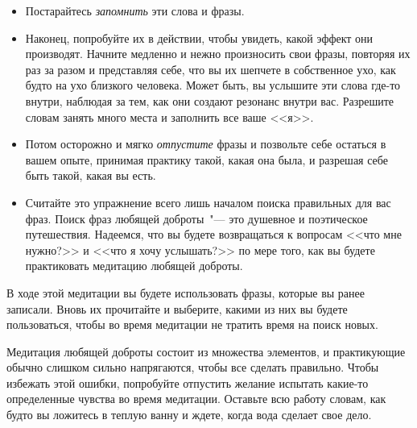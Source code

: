\begin{itemize}
	\item Постарайтесь \emph{запомнить} эти слова и фразы.
	
	\item Наконец, попробуйте их в действии, чтобы увидеть, какой эффект они производят. Начните медленно и нежно произносить свои фразы, повторяя их раз за разом и представляя себе, что вы их шепчете в собственное ухо, как будто на ухо близкого человека. Может быть, вы услышите эти слова где-то внутри, наблюдая за тем, как они создают резонанс внутри вас. Разрешите словам занять много места и заполнить все ваше <<я>>.
	
	\item Потом осторожно и мягко \emph{отпустите} фразы и позвольте себе остаться в вашем опыте, принимая практику такой, какая она была, и разрешая себе быть такой, какая вы есть.
	
	\item Считайте это упражнение всего лишь началом поиска правильных для вас фраз. Поиск фраз любящей доброты~"--- это душевное и поэтическое путешествия. Надеемся, что вы будете возвращаться к вопросам <<что мне нужно?>> и <<что я хочу услышать?>> по мере того, как вы будете практиковать медитацию любящей доброты.
\end{itemize}


\newpage
{} \label{M:Loving-Kindness_for_Ourselves}

В ходе этой медитации вы будете использовать фразы, которые вы ранее записали. Вновь их прочитайте и выберите, какими из них вы будете пользоваться, чтобы во время медитации не тратить время на поиск новых. 

Медитация любящей доброты состоит из множества элементов, и практикующие обычно слишком сильно напрягаются, чтобы все сделать правильно. Чтобы избежать этой ошибки, попробуйте отпустить желание испытать какие-то определенные чувства во время медитации. Оставьте всю работу словам, как будто вы ложитесь в теплую ванну и ждете, когда вода сделает свое дело. 

